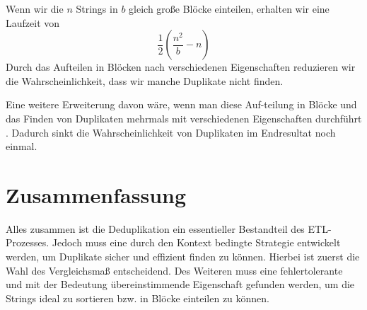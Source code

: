 \documentclass[sigconf]{acmart}
\begin{document}
Wenn wir die $n$ Strings in $b$ gleich große Blöcke
einteilen, erhalten wir eine Laufzeit von
$$\frac{1}{2} (\frac{n^2}{b}-n)$$
Durch das Aufteilen in Blöcken nach verschiedenen
Eigenschaften reduzieren wir die Wahrscheinlichkeit,
dass wir manche Duplikate nicht finden.

Eine weitere Erweiterung davon wäre, wenn man diese
Auf-teilung in Blöcke und das Finden von Duplikaten
mehrmals mit verschiedenen Eigenschaften durchführt
\cite[Vlg. S. 11]{elmagarmid1}.
Dadurch sinkt die Wahrscheinlichkeit von Duplikaten
im Endresultat noch einmal.

\section*{Zusammenfassung}
Alles zusammen ist die Deduplikation ein essentieller 
Bestandteil des ETL-Prozesses.
Jedoch muss eine durch den Kontext bedingte Strategie entwickelt
werden, um Duplikate sicher und effizient finden zu
können. Hierbei ist zuerst die Wahl des Vergleichsmaß
entscheidend. Des Weiteren muss eine fehlertolerante
und mit der Bedeutung übereinstimmende Eigenschaft
gefunden werden, um die Strings ideal zu sortieren bzw. 
in Blöcke einteilen zu können.



\end{document}
